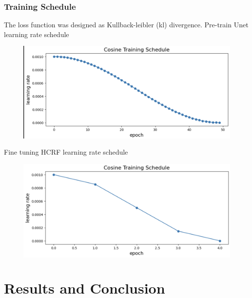 \documentclass[leqno]{beamer}
\begin{document}
\begin{frame}
	\frametitle{Training Schedule}
	The loss function was designed as Kullback-leibler (kl) divergence.	
	Pre-train Unet learning rate schedule
	\begin{figure}[tbp]
	\centering
	\includegraphics[width=.55\textwidth]{pretrain}
	\end{figure}
	Fine tuning HCRF  learning rate schedule
	\begin{figure}[tbp]
	\centering
	\includegraphics[width=.55\textwidth]{finetune}
	\end{figure}
\end{frame}

\section{Results and Conclusion}
\end{document}
